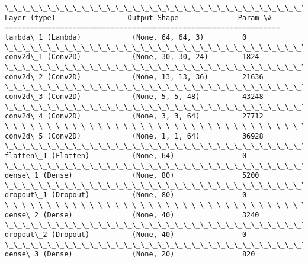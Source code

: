 \documentclass[11pt]{article}
\begin{document}
    \begin{Verbatim}[commandchars=\\\{\}]
\_\_\_\_\_\_\_\_\_\_\_\_\_\_\_\_\_\_\_\_\_\_\_\_\_\_\_\_\_\_\_\_\_\_\_\_\_\_\_\_\_\_\_\_\_\_\_\_\_\_\_\_\_\_\_\_\_\_\_\_\_\_\_\_\_
Layer (type)                 Output Shape              Param \#   
=================================================================
lambda\_1 (Lambda)            (None, 64, 64, 3)         0         
\_\_\_\_\_\_\_\_\_\_\_\_\_\_\_\_\_\_\_\_\_\_\_\_\_\_\_\_\_\_\_\_\_\_\_\_\_\_\_\_\_\_\_\_\_\_\_\_\_\_\_\_\_\_\_\_\_\_\_\_\_\_\_\_\_
conv2d\_1 (Conv2D)            (None, 30, 30, 24)        1824      
\_\_\_\_\_\_\_\_\_\_\_\_\_\_\_\_\_\_\_\_\_\_\_\_\_\_\_\_\_\_\_\_\_\_\_\_\_\_\_\_\_\_\_\_\_\_\_\_\_\_\_\_\_\_\_\_\_\_\_\_\_\_\_\_\_
conv2d\_2 (Conv2D)            (None, 13, 13, 36)        21636     
\_\_\_\_\_\_\_\_\_\_\_\_\_\_\_\_\_\_\_\_\_\_\_\_\_\_\_\_\_\_\_\_\_\_\_\_\_\_\_\_\_\_\_\_\_\_\_\_\_\_\_\_\_\_\_\_\_\_\_\_\_\_\_\_\_
conv2d\_3 (Conv2D)            (None, 5, 5, 48)          43248     
\_\_\_\_\_\_\_\_\_\_\_\_\_\_\_\_\_\_\_\_\_\_\_\_\_\_\_\_\_\_\_\_\_\_\_\_\_\_\_\_\_\_\_\_\_\_\_\_\_\_\_\_\_\_\_\_\_\_\_\_\_\_\_\_\_
conv2d\_4 (Conv2D)            (None, 3, 3, 64)          27712     
\_\_\_\_\_\_\_\_\_\_\_\_\_\_\_\_\_\_\_\_\_\_\_\_\_\_\_\_\_\_\_\_\_\_\_\_\_\_\_\_\_\_\_\_\_\_\_\_\_\_\_\_\_\_\_\_\_\_\_\_\_\_\_\_\_
conv2d\_5 (Conv2D)            (None, 1, 1, 64)          36928     
\_\_\_\_\_\_\_\_\_\_\_\_\_\_\_\_\_\_\_\_\_\_\_\_\_\_\_\_\_\_\_\_\_\_\_\_\_\_\_\_\_\_\_\_\_\_\_\_\_\_\_\_\_\_\_\_\_\_\_\_\_\_\_\_\_
flatten\_1 (Flatten)          (None, 64)                0         
\_\_\_\_\_\_\_\_\_\_\_\_\_\_\_\_\_\_\_\_\_\_\_\_\_\_\_\_\_\_\_\_\_\_\_\_\_\_\_\_\_\_\_\_\_\_\_\_\_\_\_\_\_\_\_\_\_\_\_\_\_\_\_\_\_
dense\_1 (Dense)              (None, 80)                5200      
\_\_\_\_\_\_\_\_\_\_\_\_\_\_\_\_\_\_\_\_\_\_\_\_\_\_\_\_\_\_\_\_\_\_\_\_\_\_\_\_\_\_\_\_\_\_\_\_\_\_\_\_\_\_\_\_\_\_\_\_\_\_\_\_\_
dropout\_1 (Dropout)          (None, 80)                0         
\_\_\_\_\_\_\_\_\_\_\_\_\_\_\_\_\_\_\_\_\_\_\_\_\_\_\_\_\_\_\_\_\_\_\_\_\_\_\_\_\_\_\_\_\_\_\_\_\_\_\_\_\_\_\_\_\_\_\_\_\_\_\_\_\_
dense\_2 (Dense)              (None, 40)                3240      
\_\_\_\_\_\_\_\_\_\_\_\_\_\_\_\_\_\_\_\_\_\_\_\_\_\_\_\_\_\_\_\_\_\_\_\_\_\_\_\_\_\_\_\_\_\_\_\_\_\_\_\_\_\_\_\_\_\_\_\_\_\_\_\_\_
dropout\_2 (Dropout)          (None, 40)                0         
\_\_\_\_\_\_\_\_\_\_\_\_\_\_\_\_\_\_\_\_\_\_\_\_\_\_\_\_\_\_\_\_\_\_\_\_\_\_\_\_\_\_\_\_\_\_\_\_\_\_\_\_\_\_\_\_\_\_\_\_\_\_\_\_\_
dense\_3 (Dense)              (None, 20)                820       

\end{Verbatim}
\end{document}
